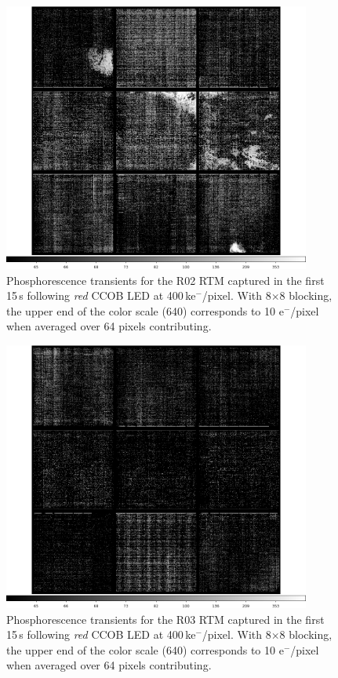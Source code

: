 \begin{figure}[!htbp]
\centering
\includegraphics[width=0.9\textwidth]{figures/phosphorescence-survey/itl_fluor_R02_0-19_rb1_log.png}
\caption{Phosphorescence transients for the R02 RTM captured in the first 15\,s following {\it red} CCOB LED at 400\,ke$^-$/pixel. With 8$\times$8 blocking, the upper end of the color scale (640) corresponds to 10 e$^-$/pixel when averaged over 64 pixels contributing.}
\label{fig:phos:R02}
\end{figure}

\begin{figure}[!htbp]
\centering
\includegraphics[width=0.9\textwidth]{figures/phosphorescence-survey/itl_fluor_R03_0-19_rb1_log.png}
\caption{Phosphorescence transients for the R03 RTM captured in the first 15\,s following {\it red} CCOB LED at 400\,ke$^-$/pixel. With 8$\times$8 blocking, the upper end of the color scale (640) corresponds to 10 e$^-$/pixel when averaged over 64 pixels contributing.}
\label{fig:phos:R03}
\end{figure}

